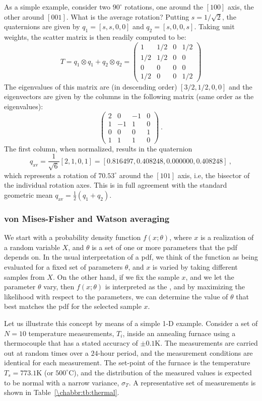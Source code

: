 As a simple example, consider two $90^{\circ}$ rotations, one around the $[100]$ axis, the other around $[001]$. What is the average rotation?  Putting $s=1/\sqrt{2}$, the quaternions are given by $q_1=[s,s,0,0]$ and $q_2=[s,0,0,s]$. Taking unit weights, the scatter matrix is then readily computed to be:
\[
	T = q_1\otimes q_1+q_2\otimes q_2 = \begin{pmatrix} 1&1/2&0&1/2\\ 1/2&1/2&0&0\\ 0&0& 0&0\\ 1/2&0&0&1/2\end{pmatrix}
\]
The eigenvalues of this matrix are (in descending order) $[3/2,1/2,0,0]$ and the eigenvectors are given by the columns in the following matrix (same order as the eigenvalues):
\[
	\begin{pmatrix}2&0&-1&0\\ 1&-1&1&0\\ 0&0&0&1\\1&1&1&0\end{pmatrix}\ .
\]
The first column, when normalized, results in the quaternion 
\[
	q_{\text{av}}=\frac{1}{\sqrt{6}}[2,1,0,1]=[0.816497, 0.408248, 0.000000, 0.408248]\ ,
\]
which represents a rotation of $70.53^{\circ}$ around the $[101]$ axis, i.e, the bisector of the individual rotation axes. This is in full agreement with the standard geometric mean $q_{\text{av}}=\frac{1}{2}(q_1+q_2)$. 


\subsubsection{von Mises-Fisher and Watson averaging}\label{\chabbr:ssec:vMFWav}

We start with a probability density function $f(x;\theta)$, where $x$ is a realization of a random variable $X$, and $\theta$ is a set of one or more parameters that the pdf depends on.  In the usual interpretation of a pdf, we think of the function as being evaluated for a fixed set of parameters $\theta$, and $x$ is varied by taking different samples from $X$. On the other hand, if we fix the sample $x$, and we let the parameter $\theta$ vary, then $f(x;\theta)$ is interpreted as the , and by maximizing the likelihood with respect to the parameters, we can determine the value of $\theta$ that best matches the pdf for the selected sample $x$.

Let us illustrate this concept by means of a simple 1-D example. Consider a set of $N=10$ temperature measurements, $T_i$, inside an annealing furnace using a thermocouple that has a stated accuracy of $\pm 0.1$K. The measurements are carried out at random times over a $24$-hour period, and the measurement conditions are identical for each measurement. The set-point of the furnace is the temperature $T_s=773.1$K (or $500^{\circ}$C), and the distribution of the measured values is expected to be normal with a narrow variance, $\sigma_T$.  A representative set of measurements is shown in Table~\ref{\chabbr:tb:thermal}.

